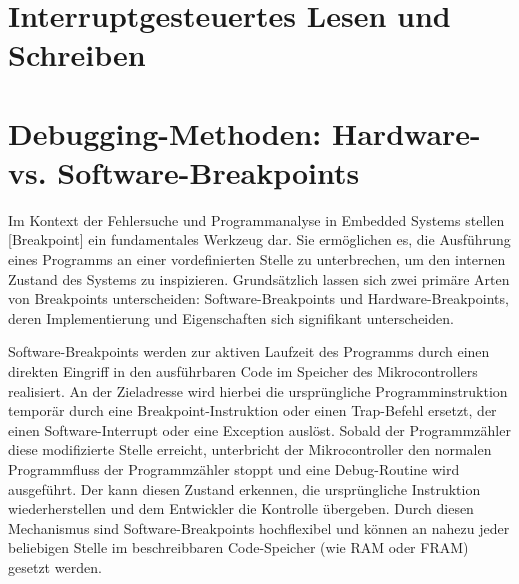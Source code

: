 \newpage
\section{Interruptgesteuertes Lesen und Schreiben}
\label{Interruptgesteuertes_Lesen&Schreiben}


\newpage
\section{Debugging-Methoden: Hardware- vs. Software-Breakpoints}
\label{Hardware_VS_Software_Breakpoints}

Im Kontext der Fehlersuche und Programmanalyse in Embedded Systems stellen [Breakpoint] ein fundamentales Werkzeug dar. Sie erm\"oglichen es, die Ausf\"uhrung eines Programms an einer vordefinierten Stelle zu unterbrechen, um den internen Zustand des Systems zu inspizieren. Grunds\"atzlich lassen sich zwei prim\"are Arten von Breakpoints unterscheiden: Software-Breakpoints und Hardware-Breakpoints, deren Implementierung und Eigenschaften sich signifikant unterscheiden.

Software-Breakpoints werden zur aktiven Laufzeit des Programms durch einen direkten Eingriff in den ausf\"uhrbaren Code im Speicher des Mikrocontrollers realisiert. An der Zieladresse wird hierbei die urspr\"ungliche Programminstruktion tempor\"ar durch eine Breakpoint-Instruktion oder einen Trap-Befehl ersetzt, der einen Software-Interrupt oder eine Exception ausl\"ost. Sobald der Programmz\"ahler diese modifizierte Stelle erreicht, unterbricht der Mikrocontroller den normalen Programmfluss der Programmz\"ahler stoppt und eine Debug-Routine wird ausgef\"uhrt. Der  kann diesen Zustand erkennen, die urspr\"ungliche Instruktion wiederherstellen und dem Entwickler die Kontrolle \"ubergeben. Durch diesen Mechanismus sind Software-Breakpoints hochflexibel und k\"onnen an nahezu jeder beliebigen Stelle im beschreibbaren Code-Speicher (wie RAM oder FRAM) gesetzt werden.

